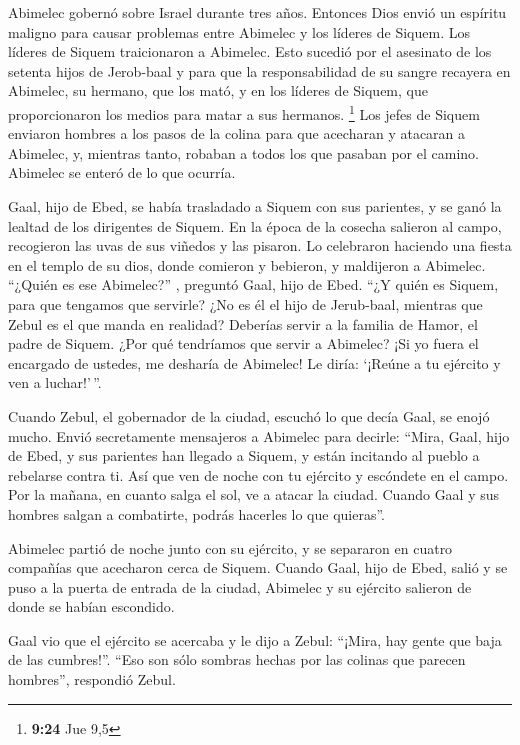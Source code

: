  Abimelec gobernó sobre Israel durante tres años.
 Entonces Dios envió un espíritu maligno para causar
problemas entre Abimelec y los líderes de Siquem. Los líderes de Siquem
traicionaron a Abimelec.  Esto sucedió por el asesinato
de los setenta hijos de Jerob-baal y para que la responsabilidad de su
sangre recayera en Abimelec, su hermano, que los mató, y en los líderes
de Siquem, que proporcionaron los medios para matar a sus hermanos.
\footnote{\textbf{9:24} Jue 9,5}  Los jefes de Siquem
enviaron hombres a los pasos de la colina para que acecharan y atacaran
a Abimelec, y, mientras tanto, robaban a todos los que pasaban por el
camino. Abimelec se enteró de lo que ocurría.

 Gaal, hijo de Ebed, se había trasladado a Siquem con sus
parientes, y se ganó la lealtad de los dirigentes de Siquem.
 En la época de la cosecha salieron al campo, recogieron
las uvas de sus viñedos y las pisaron. Lo celebraron haciendo una fiesta
en el templo de su dios, donde comieron y bebieron, y maldijeron a
Abimelec.  ``¿Quién es ese Abimelec?'' , preguntó Gaal,
hijo de Ebed. ``¿Y quién es Siquem, para que tengamos que servirle? ¿No
es él el hijo de Jerub-baal, mientras que Zebul es el que manda en
realidad? Deberías servir a la familia de Hamor, el padre de Siquem.
¿Por qué tendríamos que servir a Abimelec?  ¡Si yo fuera
el encargado de ustedes, me desharía de Abimelec! Le diría: `¡Reúne a tu
ejército y ven a luchar!'\,''.

 Cuando Zebul, el gobernador de la ciudad, escuchó lo que
decía Gaal, se enojó mucho.  Envió secretamente
mensajeros a Abimelec para decirle: ``Mira, Gaal, hijo de Ebed, y sus
parientes han llegado a Siquem, y están incitando al pueblo a rebelarse
contra ti.  Así que ven de noche con tu ejército y
escóndete en el campo.  Por la mañana, en cuanto salga el
sol, ve a atacar la ciudad. Cuando Gaal y sus hombres salgan a
combatirte, podrás hacerles lo que quieras''.

 Abimelec partió de noche junto con su ejército, y se
separaron en cuatro compañías que acecharon cerca de Siquem.
 Cuando Gaal, hijo de Ebed, salió y se puso a la puerta
de entrada de la ciudad, Abimelec y su ejército salieron de donde se
habían escondido.

 Gaal vio que el ejército se acercaba y le dijo a Zebul:
``¡Mira, hay gente que baja de las cumbres!''. ``Eso son sólo sombras
hechas por las colinas que parecen hombres'', respondió Zebul.

